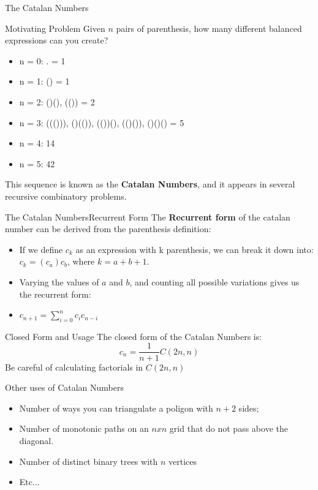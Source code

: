 \begin{frame}{The Catalan Numbers}
  \begin{block}{Motivating Problem}
    Given $n$ pairs of parenthesis, how many different balanced expressions can you create?\bigskip

    \begin{itemize}
      \item n = 0: . = 1
      \item n = 1: () = 1
      \item n = 2: ()(), (()) = 2
      \item n = 3: ((())), ()(()), (())(), (()()), ()()() = 5
      \item n = 4: 14
      \item n = 5: 42
    \end{itemize}
  \end{block}\bigskip

  This sequence is known as the {\bf Catalan Numbers}, and it appears in
  several recursive combinatory problems.
\end{frame}

\begin{frame}{The Catalan Numbers}{Recurrent Form}
  The {\bf Recurrent form} of the catalan number can be derived from the parenthesis definition:\bigskip

  \begin{itemize}
    \item If we define $c_k$ as an expression with k parenthesis, we can break it down into: $c_k = (c_a)c_b$, where $k = a + b + 1$. \medskip

    \item Varying the values of $a$ and $b$, and counting all possible variations gives us the recurrent form:\medskip

    \item $c_{n+1} = \sum_{i=0}^n c_ic_{n-i}$
  \end{itemize}
\end{frame}


\begin{frame}{Closed Form and Usage}
  The closed form of the Catalan Numbers is:
  \begin{equation*}
    c_n = \frac{1}{n+1}C(2n,n)
  \end{equation*}
  Be careful of calculating factorials in $C(2n,n)$\bigskip

  \begin{block}{Other uses of Catalan Numbers}
    \begin{itemize}
    \item Number of ways you can triangulate a poligon with $n+2$ sides;
    \item Number of monotonic paths on an $nxn$ grid that do not pass above
      the diagonal.
    \item Number of distinct binary trees with $n$ vertices
    \item Etc...
    \end{itemize}
  \end{block}
\end{frame}


